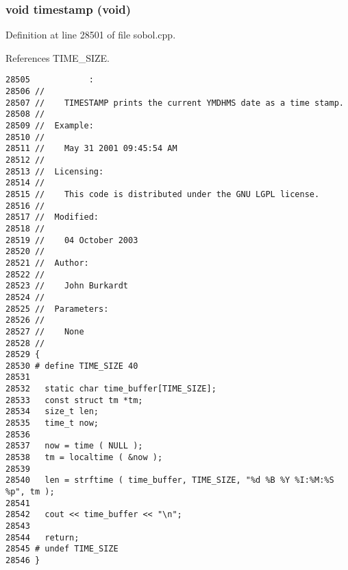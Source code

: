 \subsubsection{\setlength{\rightskip}{0pt plus 5cm}void timestamp (void)}\label{test_2sobol_8H_02d8f81e512334c1e2e5be025c41afa8}




Definition at line 28501 of file sobol.cpp.

References TIME\_\-SIZE.

\begin{Code}\begin{verbatim}28505            :
28506 //
28507 //    TIMESTAMP prints the current YMDHMS date as a time stamp.
28508 //
28509 //  Example:
28510 //
28511 //    May 31 2001 09:45:54 AM
28512 //
28513 //  Licensing:
28514 //
28515 //    This code is distributed under the GNU LGPL license. 
28516 //
28517 //  Modified:
28518 //
28519 //    04 October 2003
28520 //
28521 //  Author:
28522 //
28523 //    John Burkardt
28524 //
28525 //  Parameters:
28526 //
28527 //    None
28528 //
28529 {
28530 # define TIME_SIZE 40
28531 
28532   static char time_buffer[TIME_SIZE];
28533   const struct tm *tm;
28534   size_t len;
28535   time_t now;
28536 
28537   now = time ( NULL );
28538   tm = localtime ( &now );
28539 
28540   len = strftime ( time_buffer, TIME_SIZE, "%d %B %Y %I:%M:%S %p", tm );
28541 
28542   cout << time_buffer << "\n";
28543 
28544   return;
28545 # undef TIME_SIZE
28546 }

\end{verbatim}
\end{Code}


